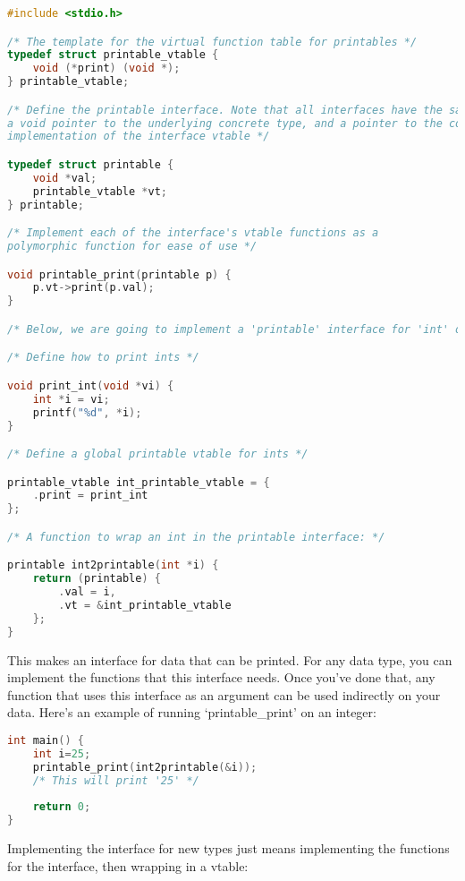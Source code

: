 \documentclass[12pt]{article}
\begin{document}
\begin{lstlisting}[language=C]
#include <stdio.h>

/* The template for the virtual function table for printables */
typedef struct printable_vtable {
    void (*print) (void *);
} printable_vtable;

/* Define the printable interface. Note that all interfaces have the same structure:
a void pointer to the underlying concrete type, and a pointer to the concrete type's
implementation of the interface vtable */

typedef struct printable {
    void *val;
    printable_vtable *vt;
} printable;

/* Implement each of the interface's vtable functions as a
polymorphic function for ease of use */

void printable_print(printable p) {
    p.vt->print(p.val);
}

/* Below, we are going to implement a 'printable' interface for 'int' objects */

/* Define how to print ints */

void print_int(void *vi) {
    int *i = vi;
    printf("%d", *i);
}

/* Define a global printable vtable for ints */

printable_vtable int_printable_vtable = {
    .print = print_int
};

/* A function to wrap an int in the printable interface: */

printable int2printable(int *i) {
    return (printable) {
        .val = i,
        .vt = &int_printable_vtable
    };
}
\end{lstlisting}

This makes an interface for data that can be printed. For any data type,
you can implement the functions that this interface needs. Once you've done that,
any function that uses this interface as an argument can be used indirectly on
your data. Here's an example of running `printable\_print' on an integer:

\begin{lstlisting}[language=C]
int main() {
    int i=25;
    printable_print(int2printable(&i));
    /* This will print '25' */
    
    return 0;
}
\end{lstlisting}

Implementing the interface for new types just means implementing the functions for the interface, then wrapping in a vtable:
\end{document}
